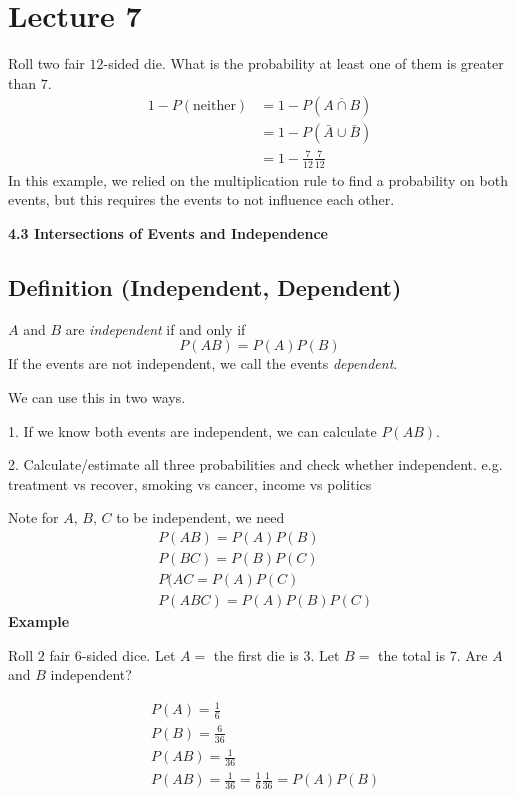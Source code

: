 \section{Lecture 7}
Roll two fair $ 12 $-sided die. What is the probability at least one of them
is greater than $ 7 $.
\begin{align*}
    1-P(\text{neither})&=1-P(\overline{A\cap B})\\
    &=1-P(\bar{A}\cup \bar{B})\\
    &=1-\frac{7}{12}\frac{7}{12}
\end{align*}
In this example, we relied on the multiplication rule to find a probability
on both events, but this requires the events to not influence each other.

\textbf{4.3 Intersections of Events and Independence}

\begin{defbox}
    \subsection{Definition (Independent, Dependent)}
    $ A $ and $ B $ are \emph{independent} if and only if
    \[ P(AB) =P(A)P(B)\]
    If the events are not independent, we call the events \emph{dependent}.
\end{defbox}
We can use this in two ways.

1. If we know both events are independent, we can calculate $ P(AB) $.

2. Calculate/estimate all three probabilities and check whether independent.
e.g. treatment vs recover, smoking vs cancer, income vs politics

Note for $ A,\,B,\,C $ to be independent, we need
\begin{align*}
    &P(AB)=P(A)P(B)\\
    &P(BC)=P(B)P(C)\\
    &P(AC=P(A)P(C)\\
    &P(ABC)=P(A)P(B)P(C)
\end{align*}
\textbf{Example}

Roll $ 2 $ fair $ 6 $-sided dice. Let $ A=$ the first die is $ 3 $. Let
$ B= $ the total is $ 7 $. Are $ A $ and $ B $ independent?

\begin{align*}
    &P(A)=\frac{1}{6}\\
    &P(B)=\frac{6}{36}\\
    &P(AB)=\frac{1}{36}\\
    &P(AB)=\frac{1}{36}=\frac{1}{6} \frac{1}{36}=P(A)P(B)
\end{align*}

